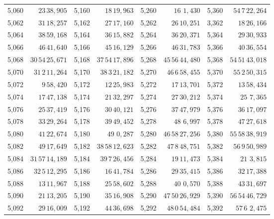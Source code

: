 \begin{tabular}{|r|r||r|r||r|r||r|r|}
5,060 & \(23\,38,\!905\) & 5,160 & \(18\,19,\!963\) & 5,260 & \(16\,\,1,\!430\) & 5,360 & \(54\,7\,22,\!264\) \\[1pt]
5,062 & \(31\,18,\!257\) & 5,162 & \(27\,17,\!160\) & 5,262 & \(26\,10,\!251\) & 3,362 & \(18\,26,\!166\) \\
5,064 & \(38\,59,\!168\) & 5,164 & \(36\,15,\!882\) & 5,264 & \(36\,20,\!371\) & 5,364 & \(29\,30,\!933\) \\
5,066 & \(46\,41,\!640\) & 5,166 & \(45\,16,\!129\) & 5,266 & \(46\,31,\!783\) & 5,366 & \(40\,36,\!554\) \\
5,068 & \(30\,54\,25,\!671\) & 5,168 & \(37\,54\,17,\!896\) & 5,268 & \(45\,56\,44,\!480\) & 5,368 & \(54\,51\,43,\!018\) \\[1pt]
5,070 & \(31\,2\,11,\!264\) & 5,170 & \(38\,3\,21,\!182\) & 5,270 & \(46\,6\,58,\!455\) & 5,370 & \(55\,2\,50,\!315\) \\[1pt]
5,072 & \(9\,58,\!420\) & 5,172 & \(12\,25,\!983\) & 5,272 & \(17\,13,\!701\) & 5,372 & \(13\,58,\!434\) \\
5,074 & \(17\,47,\!138\) & 5,174 & \(21\,32,\!297\) & 5,274 & \(27\,30,\!212\) & 5,374 & \(25\,\,7,\!365\) \\
5,076 & \(25\,37,\!419\) & 5,176 & \(30\,40,\!121\) & 5,276 & \(37\,47,\!979\) & 5,376 & \(36\,17,\!097\) \\
5,078 & \(33\,29,\!264\) & 5,178 & \(39\,49,\!452\) & 5,278 & \(48\,\,6,\!997\) & 5,378 & \(47\,27,\!618\) \\[1pt]
5,080 & \(41\,22,\!674\) & 5,180 & \(49\,\,0,\!287\) & 5,280 & \(46\,58\,27,\!256\) & 5,380 & \(55\,58\,38,\!919\) \\[1pt]
5,082 & \(49\,17,\!649\) & 5,182 & \(38\,58\,12,\!623\) & 5,282 & \(47\,8\,48,\!751\) & 5,382 & \(56\,9\,50,\!989\) \\
5,084 & \(31\,57\,14,\!189\) & 5,184 & \(39\,7\,26,\!456\) & 5,284 & \(19\,11,\!473\) & 5,384 & \(21\,\,3,\!815\) \\
5,086 & \(32\,5\,12,\!295\) & 5,186 & \(16\,41,\!784\) & 5,286 & \(29\,35,\!415\) & 5,386 & \(32\,17,\!388\) \\
5,088 & \(13\,11,\!967\) & 5,188 & \(25\,58,\!602\) & 5,288 & \(40\,\,0,\!570\) & 5,388 & \(43\,31,\!697\) \\[1pt]
5,090 & \(21\,13,\!205\) & 5,190 & \(35\,16,\!908\) & 5,290 & \(47\,50\,26,\!929\) & 5,390 & \(56\,54\,46,\!729\) \\[1pt]
5,092 & \(29\,16,\!009\) & 5,192 & \(44\,36,\!698\) & 5,292 & \(48\,0\,54,\!484\) & 5,392 & \(57\,6\,\,2,\!475\) \\

\end{tabular}

